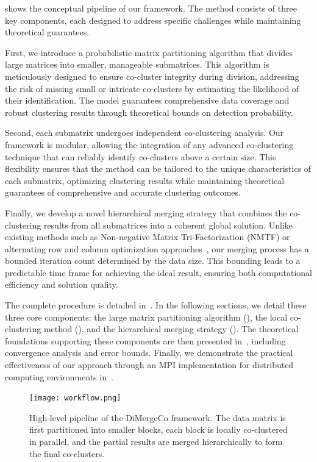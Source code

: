\documentclass[journal]{IEEEtran}
\theoremstyle{definition}
\theoremstyle{remark} %
\renewcommand{\cite}[1]{~\autocite{#1}}
\begin{document}
 shows the conceptual pipeline of our framework. The method consists of three key components, each designed to address specific challenges while maintaining theoretical guarantees.

First, we introduce a probabilistic matrix partitioning algorithm that divides large matrices into smaller, manageable submatrices. This algorithm is meticulously designed to ensure co-cluster integrity during division, addressing the risk of missing small or intricate co-clusters by estimating the likelihood of their identification. The model guarantees comprehensive data coverage and robust clustering results through theoretical bounds on detection probability.

Second, each submatrix undergoes independent co-clustering analysis. Our framework is modular, allowing the integration of any advanced co-clustering technique that can reliably identify co-clusters above a certain size. This flexibility ensures that the method can be tailored to the unique characteristics of each submatrix, optimizing clustering results while maintaining theoretical guarantees of comprehensive and accurate clustering outcomes.

Finally, we develop a novel hierarchical merging strategy that combines the co-clustering results from all submatrices into a coherent global solution. Unlike existing methods such as Non-negative Matrix Tri-Factorization (NMTF) or alternating row and column optimization approaches\cite{wang2011FastNonnegativeMatrix}, our merging process has a bounded iteration count determined by the data size. This bounding leads to a predictable time frame for achieving the ideal result, ensuring both computational efficiency and solution quality.

The complete procedure is detailed in~. In the following sections, we detail these three core components: the large matrix partitioning algorithm (), the local co-clustering method (), and the hierarchical merging strategy (). The theoretical foundations supporting these components are then presented in~, including convergence analysis and error bounds. Finally, we demonstrate the practical effectiveness of our approach through an MPI implementation for distributed computing environments in~.

\begin{figure}[t]
    \centering
    \texttt{[image: workflow.png]} %
    \caption{High-level pipeline of the DiMergeCo framework. The data matrix is first partitioned into smaller blocks, each block is locally co-clustered in parallel, and the partial results are merged hierarchically to form the final co-clusters.}
    \label{fig:DiMergeCo-pipeline}
\end{figure}
\end{document}
